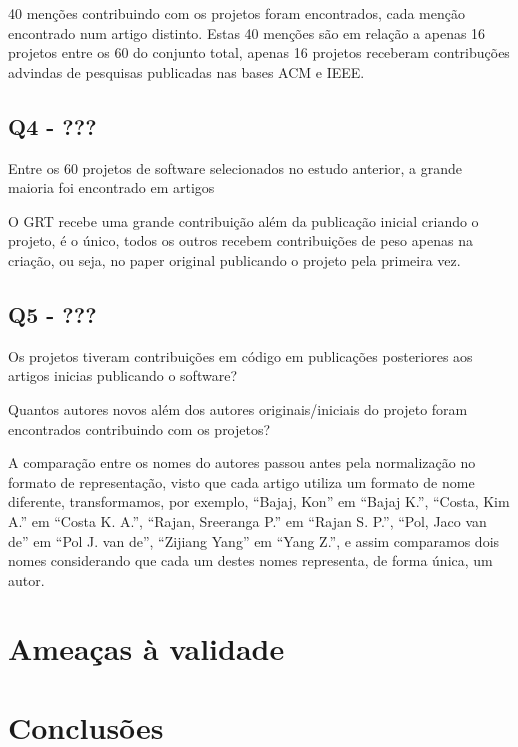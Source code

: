 
40 menções contribuindo com os projetos foram encontrados, cada menção
encontrado num artigo distinto. Estas 40 menções são em relação a apenas
16 projetos entre os 60 do conjunto total, apenas 16 projetos receberam
contribuções advindas de pesquisas publicadas nas bases ACM e IEEE.

\subsection{Q4 - ???}

Entre os 60 projetos de software selecionados no estudo anterior, a grande maioria
foi encontrado em artigos 

O GRT recebe uma grande contribuição além da publicação inicial criando o projeto,
é o único, todos os outros recebem contribuições de peso apenas na criação, ou seja,
no paper original publicando o projeto pela primeira vez.

\subsection{Q5 - ???}

Os projetos tiveram contribuições em código em publicações posteriores aos
artigos inicias publicando o software?

Quantos autores novos além dos autores originais/iniciais do projeto
foram encontrados contribuindo com os projetos?

%

A comparação entre os nomes do autores passou antes pela normalização
no formato de representação, visto que cada artigo utiliza um formato
de nome diferente, transformamos, por exemplo, ``Bajaj, Kon'' em ``Bajaj K.'',
``Costa, Kim A.'' em ``Costa K. A.'', ``Rajan, Sreeranga P.'' em ``Rajan S. P.'',
``Pol, Jaco van de'' em ``Pol J. van de'', ``Zijiang Yang'' em ``Yang Z.'',
e assim comparamos dois nomes considerando que cada um destes nomes representa,
de forma única, um autor.


\section{Ameaças à validade}

\section{Conclusões} \label{estudo2:conclusoes} %

